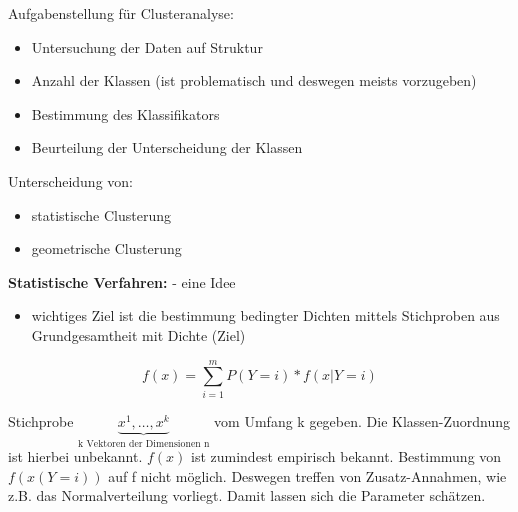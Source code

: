 \documentclass[a4paper,12pt]{scrreprt}
\newcommand{\Nb}[1]{\textbf{#1}}
\begin{document}
Aufgabenstellung für Clusteranalyse:
\begin{itemize}
\item Untersuchung der Daten auf Struktur
\item Anzahl der Klassen (ist problematisch und deswegen meists vorzugeben)
\item Bestimmung des Klassifikators
\item Beurteilung der Unterscheidung der Klassen
\end{itemize}

Unterscheidung von:
\begin{itemize}
\item statistische Clusterung
\item geometrische Clusterung
\end{itemize}
\Nb{Statistische Verfahren:} - eine Idee\\
\begin{itemize}
 \item wichtiges Ziel ist die bestimmung bedingter Dichten mittels Stichproben aus Grundgesamtheit mit Dichte (Ziel)
\end{itemize}
$$ f(x)=\sum\limits^m_{i=1}P(Y=i) * f(x|Y=i)$$

Stichprobe $ \underbrace{x^1,\dots,x^k}_{\text{k Vektoren der Dimensionen n}}$ vom Umfang k gegeben.
Die Klassen-Zuordnung ist hierbei unbekannt. $f(x)$ ist zumindest
empirisch bekannt. Bestimmung von $f(x(Y=i))$ auf f nicht möglich.
Deswegen treffen von Zusatz-Annahmen, wie z.B. das Normalverteilung
vorliegt. Damit lassen sich die Parameter schätzen.
\end{document}
